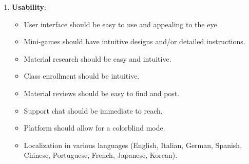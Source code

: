 \begin{enumerate}
	\item \textbf{Usability}: 
	\begin{itemize}
		\item User interface should be easy to use and appealing to the eye.
		\item Mini-games should have intuitive designs and/or detailed instructions.
		\item Material research should be easy and intuitive.
		\item Class enrollment should be intuitive.
		\item Material reviews should be easy to find and post.
		\item Support chat should be immediate to reach.
		\item Platform should allow for a colorblind mode.			
		\item Localization in various languages (English, Italian, German, Spanish, Chinese, Portuguese, French, Japanese, Korean).
	\end{itemize}
\end{enumerate}

